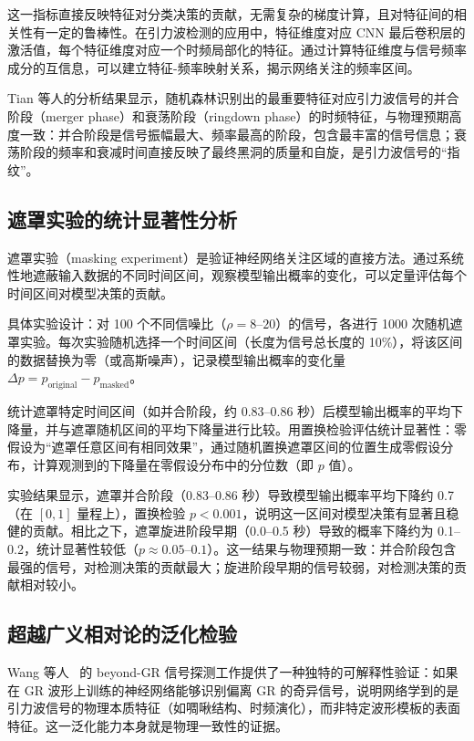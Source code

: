 这一指标直接反映特征对分类决策的贡献，无需复杂的梯度计算，且对特征间的相关性有一定的鲁棒性。在引力波检测的应用中，特征维度对应 CNN 最后卷积层的激活值，每个特征维度对应一个时频局部化的特征。通过计算特征维度与信号频率成分的互信息，可以建立特征-频率映射关系，揭示网络关注的频率区间。

Tian 等人的分析结果显示，随机森林识别出的最重要特征对应引力波信号的并合阶段（merger phase）和衰荡阶段（ringdown phase）的时频特征，与物理预期高度一致：并合阶段是信号振幅最大、频率最高的阶段，包含最丰富的信号信息；衰荡阶段的频率和衰减时间直接反映了最终黑洞的质量和自旋，是引力波信号的“指纹”。

\subsection{遮罩实验的统计显著性分析}

遮罩实验（masking experiment）是验证神经网络关注区域的直接方法。通过系统性地遮蔽输入数据的不同时间区间，观察模型输出概率的变化，可以定量评估每个时间区间对模型决策的贡献。

具体实验设计：对 100 个不同信噪比（$\rho = 8$--$20$）的信号，各进行 1000 次随机遮罩实验。每次实验随机选择一个时间区间（长度为信号总长度的 10\%），将该区间的数据替换为零（或高斯噪声），记录模型输出概率的变化量 $\Delta p = p_{\text{original}} - p_{\text{masked}}$。

统计遮罩特定时间区间（如并合阶段，约 0.83--0.86 秒）后模型输出概率的平均下降量，并与遮罩随机区间的平均下降量进行比较。用置换检验评估统计显著性：零假设为“遮罩任意区间有相同效果”，通过随机置换遮罩区间的位置生成零假设分布，计算观测到的下降量在零假设分布中的分位数（即 $p$ 值）。

实验结果显示，遮罩并合阶段（0.83--0.86 秒）导致模型输出概率平均下降约 0.7（在 $[0,1]$ 量程上），置换检验 $p < 0.001$，说明这一区间对模型决策有显著且稳健的贡献。相比之下，遮罩旋进阶段早期（0.0--0.5 秒）导致的概率下降约为 0.1--0.2，统计显著性较低（$p \approx 0.05$--$0.1$）。这一结果与物理预期一致：并合阶段包含最强的信号，对检测决策的贡献最大；旋进阶段早期的信号较弱，对检测决策的贡献相对较小。

\subsection{超越广义相对论的泛化检验}

Wang 等人~\cite{wang2025beyondgr} 的 beyond-GR 信号探测工作提供了一种独特的可解释性验证：如果在 GR 波形上训练的神经网络能够识别偏离 GR 的奇异信号，说明网络学到的是引力波信号的物理本质特征（如啁啾结构、时频演化），而非特定波形模板的表面特征。这一泛化能力本身就是物理一致性的证据。

